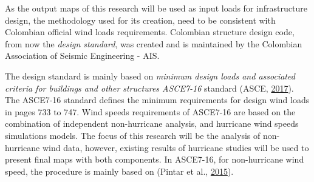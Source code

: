 \documentclass[12pt,oneside]{reedthesis}
\begin{document}
As the output maps of this research will be used as input loads for infrastructure design, the methodology used for its creation, need to be consistent with Colombian official wind loads requirements. Colombian structure design code, from now the \emph{design standard}, was created and is maintained by the Colombian Association of Seismic Engineering - AIS.

The design standard is mainly based on \emph{minimum design loads and associated criteria for buildings and other structures ASCE7-16} standard (ASCE, \protect\hyperlink{ref-Asce2017}{2017}). The ASCE7-16 standard defines the minimum requirements for design wind loads in pages 733 to 747. Wind speeds requirements of ASCE7-16 are based on the combination of independent non-hurricane analysis, and hurricane wind speeds simulations models. The focus of this research will be the analysis of non-hurricane wind data, however, existing results of hurricane studies will be used to present final maps with both components. In ASCE7-16, for non-hurricane wind speed, the procedure is mainly based on (Pintar et al., \protect\hyperlink{ref-Pintar2015}{2015}).
\end{document}
